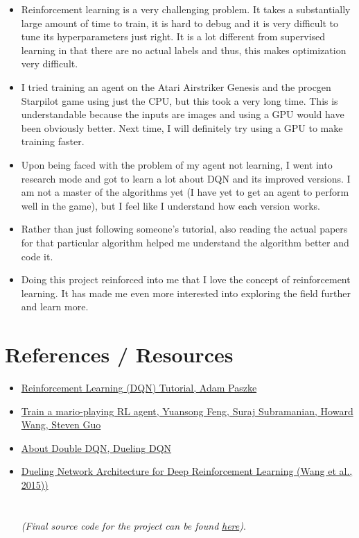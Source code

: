 \documentclass[paper=a4, fontsize=11pt, margin=1in]{scrartcl}
\numberwithin{equation}{section}		%
\numberwithin{figure}{section}			%
\numberwithin{table}{section}				%
\begin{document}
\begin{itemize}
    \item Reinforcement learning is a very challenging problem. It takes a substantially large amount of time to train, it is hard to debug and it is very difficult to tune its hyperparameters just right. It is a lot different from supervised learning in that there are no actual labels and thus, this makes optimization very difficult. 
    \item I tried training an agent on the Atari Airstriker Genesis and the procgen Starpilot game using just the CPU, but this took a very long time. This is understandable because the inputs are images and using a GPU would have been obviously better. Next time, I will definitely try using a GPU to make training faster.
    \item Upon being faced with the problem of my agent not learning, I went into research mode and got to learn a lot about DQN and its improved versions. I am not a master of the algorithms yet (I have yet to get an agent to perform well in the game), but I feel like I understand how each version works. 
    \item Rather than just following someone's tutorial, also reading the actual papers for that particular algorithm helped me understand the algorithm better and code it.
    \item Doing this project reinforced into me that I love the concept of reinforcement learning. It has made me even more interested into exploring the field further and learn more.
\end{itemize}

\pagebreak
\section{References / Resources}
\begin{itemize}
    \item \href{https://pytorch.org/tutorials/intermediate/reinforcement_q_learning.html}{Reinforcement Learning (DQN) Tutorial, Adam Paszke}
    \item \href{https://pytorch.org/tutorials/intermediate/mario_rl_tutorial.html}{Train a mario-playing RL agent, Yuansong Feng, Suraj Subramanian, Howard Wang, Steven Guo}
    \item \href{https://horomary.hatenablog.com/entry/2021/02/06/013412}{About Double DQN, Dueling DQN}
    \item \href{https://arxiv.org/abs/1511.06581}{Dueling Network Architecture for Deep Reinforcement Learning (Wang et al., 2015))}\\\\\\
    \emph{(Final source code for the project can be found} \href{https://github.com/00ber/ml-reinforcement-learning}{\emph{here}}\emph{)}.
\end{itemize}




\end{document}
